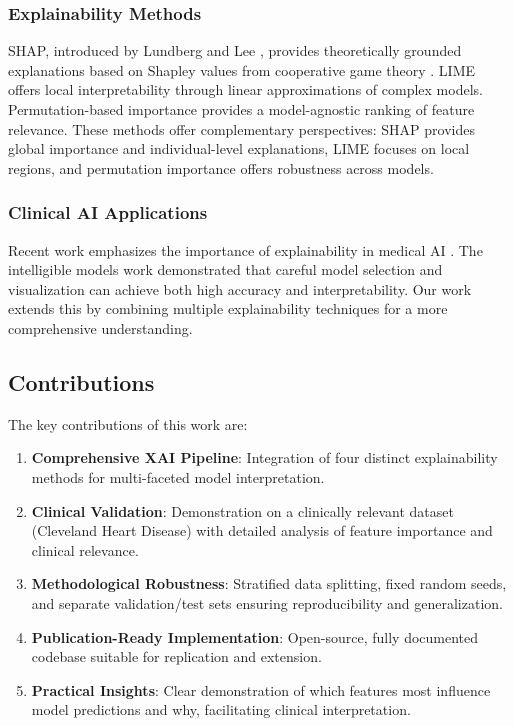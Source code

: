 \documentclass[journal]{IEEEtran}
\begin{document}
\subsubsection{Explainability Methods}
SHAP, introduced by Lundberg and Lee \cite{lundberg2017unified}, provides theoretically grounded explanations based on Shapley values from cooperative game theory \cite{shapley1953value}. LIME \cite{ribeiro2016should} offers local interpretability through linear approximations of complex models. Permutation-based importance \cite{fisher2019all} provides a model-agnostic ranking of feature relevance. These methods offer complementary perspectives: SHAP provides global importance and individual-level explanations, LIME focuses on local regions, and permutation importance offers robustness across models.

\subsubsection{Clinical AI Applications}
Recent work emphasizes the importance of explainability in medical AI \cite{caruana2015intelligible}. The intelligible models work \cite{caruana2015intelligible} demonstrated that careful model selection and visualization can achieve both high accuracy and interpretability. Our work extends this by combining multiple explainability techniques for a more comprehensive understanding.

\subsection{Contributions}

The key contributions of this work are:

\begin{enumerate}
    \item \textbf{Comprehensive XAI Pipeline}: Integration of four distinct explainability methods for multi-faceted model interpretation.
    \item \textbf{Clinical Validation}: Demonstration on a clinically relevant dataset (Cleveland Heart Disease) with detailed analysis of feature importance and clinical relevance.
    \item \textbf{Methodological Robustness}: Stratified data splitting, fixed random seeds, and separate validation/test sets ensuring reproducibility and generalization.
    \item \textbf{Publication-Ready Implementation}: Open-source, fully documented codebase suitable for replication and extension.
    \item \textbf{Practical Insights}: Clear demonstration of which features most influence model predictions and why, facilitating clinical interpretation.
\end{enumerate}
\end{document}
